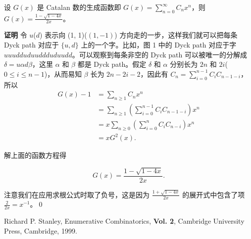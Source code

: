 \begin{thm}
设 $G(x)$ 是 Catalan 数的生成函数即
$G(x)=\sum\limits_{n=0}^{\infty}C_nx^n$，则
$G(x)=\frac{1-\sqrt{1-4x}}{2x}$。
\end{thm}
{\bf{证明}} 令 $u$($d$) 表示向 (1, 1)($(1,-1)$)
方向走的一步，这样我们就可以把每条 Dyck path 对应于 $\{u, d\}$
上的一个字。比如，图 1 中的 Dyck path 对应于字
$uuudduduuddduduudd$。可以观察到每条非空的 Dyck path
可以被唯一的分解成 $\delta=u\alpha d\beta$，这里 $\alpha$ 和 $\beta$
都是 Dyck path。假定 $\delta$ 和 $\alpha$ 分别长为 $2n$ 和
$2i$($0\le i\le n-1$)，从而易知 $\beta$ 长为 $2n-2i-2$，因此有
$C_n=\sum\limits_{i=0}^{n-1}C_iC_{n-1-i}$，所以
\begin{align*}
G(x)-1%
&=\sum_{n\ge1}C_nx^n\\
&=\sum_{n\ge1}\left(\sum_{i=0}^{n-1}C_iC_{n-1-i}\right)x^n\\%
&=x\sum_{n\ge0}\left(\sum_{i=0}^{n}C_iC_{n-i}\right)x^{n}\\
&=xG^2(x).%
\end{align*}

解上面的函数方程得

\[
G(x)=\frac{1-\sqrt{1-4x}}{2x}.
\]

注意我们在应用求根公式时取了负号，这是因为
$\frac{1+\sqrt{1-4x}}{2x}$ 的展开式中包含了项
$\frac{2}{2x}=x^{-1}$。\qed

\begin{thebibliography}{99}

Richard P. Stanley, Enumerative Combinatorics, {\bf Vol. 2},
Cambridge University Press, Cambridge, 1999.


\end{thebibliography}

\clearpage
